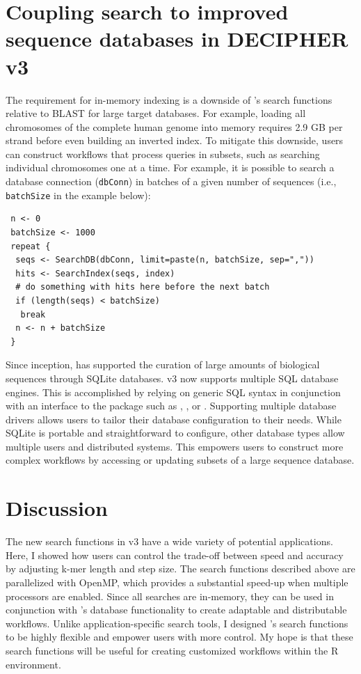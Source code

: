 \section{Coupling search to improved sequence databases in DECIPHER v3}\label{coupling-search-to-improved-sequence-databases-in-decipher-v3}

The requirement for in-memory indexing is a downside of 's search functions relative to BLAST for large target databases. For example, loading all chromosomes of the complete human genome into memory requires 2.9 GB per strand before even building an inverted index. To mitigate this downside, users can construct workflows that process queries in subsets, such as searching individual chromosomes one at a time. For example, it is possible to search a database connection (\texttt{dbConn}) in batches of a given number of sequences (i.e., \texttt{batchSize} in the example below):

\begin{verbatim}
 n <- 0
 batchSize <- 1000
 repeat {
  seqs <- SearchDB(dbConn, limit=paste(n, batchSize, sep=","))
  hits <- SearchIndex(seqs, index)
  # do something with hits here before the next batch
  if (length(seqs) < batchSize)
   break
  n <- n + batchSize
 }
\end{verbatim}

Since inception,  has supported the curation of large amounts of biological sequences through SQLite databases.  v3 now supports multiple SQL database engines. This is accomplished by relying on generic SQL syntax in conjunction with an interface to the  package such as , , or . Supporting multiple database drivers allows users to tailor their database configuration to their needs. While SQLite is portable and straightforward to configure, other database types allow multiple users and distributed systems. This empowers users to construct more complex workflows by accessing or updating subsets of a large sequence database.

\section{Discussion}\label{discussion}

The new search functions in  v3 have a wide variety of potential applications. Here, I showed how users can control the trade-off between speed and accuracy by adjusting k-mer length and step size. The search functions described above are parallelized with OpenMP, which provides a substantial speed-up when multiple processors are enabled. Since all searches are in-memory, they can be used in conjunction with 's database functionality to create adaptable and distributable workflows. Unlike application-specific search tools, I designed 's search functions to be highly flexible and empower users with more control. My hope is that these search functions will be useful for creating customized workflows within the R environment.

